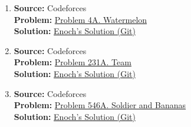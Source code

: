 \documentclass[../../../main.tex]{subfiles}
\begin{document}
\begin{enumerate}
\item
\textbf{Source:} Codeforces \\
\textbf{Problem:}
\href{https://codeforces.com/problemset/problem/4/A}{Problem 4A. Watermelon} \\
\textbf{Solution:}
\href{https://github.com/enochness/Archive/blob/main/B/cpp/B26115.cpp}{Enoch's Solution (Git)}

\item
\textbf{Source:} Codeforces \\
\textbf{Problem:}
\href{https://codeforces.com/problemset/problem/231/A}{Problem 231A. Team} \\
\textbf{Solution:}
\href{https://github.com/enochness/Archive/blob/main/B/cpp/B26116.cpp}{Enoch's Solution (Git)}

\item
\textbf{Source:} Codeforces \\
\textbf{Problem:}
\href{https://codeforces.com/problemset/problem/546/A}{Problem 546A. Soldier and Bananas} \\
\textbf{Solution:}
\href{https://github.com/enochness/Archive/blob/main/B/cpp/B26117.cpp}{Enoch's Solution (Git)}
\end{enumerate}
\end{document}
